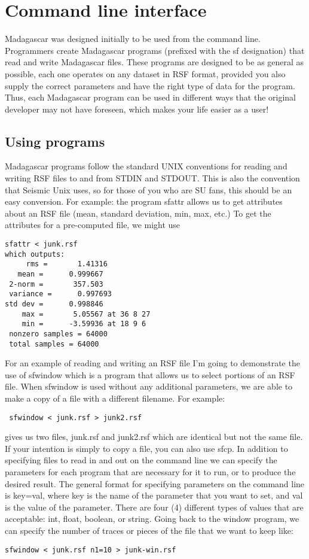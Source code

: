 \section{Command line interface}
Madagascar was designed initially to be used from the command line. Programmers create Madagascar programs (prefixed with the sf designation) that read and write Madagascar files. These programs are designed to be as general as possible, each one operates on any dataset in RSF format, provided you also supply the correct parameters and have the right type of data for the program. Thus, each Madagascar program can be used in different ways that the original developer may not have foreseen, which makes your life easier as a user!

\subsection{Using programs}
Madagascar programs follow the standard UNIX conventions for reading and writing RSF files to and from STDIN and STDOUT. This is also the convention that Seismic Unix uses, so for those of you who are SU fans, this should be an easy conversion.
For example: the program sfattr allows us to get attributes about an RSF file (mean, standard deviation, min, max, etc.) To get the attributes for a pre-computed file, we might use
\begin{verbatim}
sfattr < junk.rsf
which outputs:
     rms =       1.41316 
   mean =      0.999667 
 2-norm =       357.503 
 variance =      0.997693 
std dev =      0.998846 
    max =       5.05567 at 36 8 27 
    min =      -3.59936 at 18 9 6 
 nonzero samples = 64000 
 total samples = 64000 
 \end{verbatim}
For an example of reading and writing an RSF file I'm going to demonstrate the use of sfwindow which is a program that allows us to select portions of an RSF file. When sfwindow is used without any additional parameters, we are able to make a copy of a file with a different filename. For example:
\begin{verbatim}
 sfwindow < junk.rsf > junk2.rsf
 \end{verbatim}
gives us two files, junk.rsf and junk2.rsf which are identical but not the same file. If your intention is simply to copy a file, you can also use sfcp.
In addition to specifying files to read in and out on the command line we can specify the parameters for each program that are necessary for it to run, or to produce the desired result. The general format for specifying parameters on the command line is key=val, where key is the name of the parameter that you want to set, and val is the value of the parameter. There are four (4) different types of values that are acceptable: int, float, boolean, or string. Going back to the window program, we can specify the number of traces or pieces of the file that we want to keep like:
\begin{verbatim}
sfwindow < junk.rsf n1=10 > junk-win.rsf
\end{verbatim}

